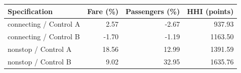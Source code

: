 \begin{tabular}{lrrr}
\toprule
Specification & Fare (\%) & Passengers (\%) & HHI (points) \\
\midrule
connecting / Control A & 2.57 & -2.67 & 937.93 \\
connecting / Control B & -1.70 & -1.19 & 1163.50 \\
nonstop / Control A & 18.56 & 12.99 & 1391.59 \\
nonstop / Control B & 9.02 & 32.95 & 1635.76 \\
\bottomrule
\end{tabular}

